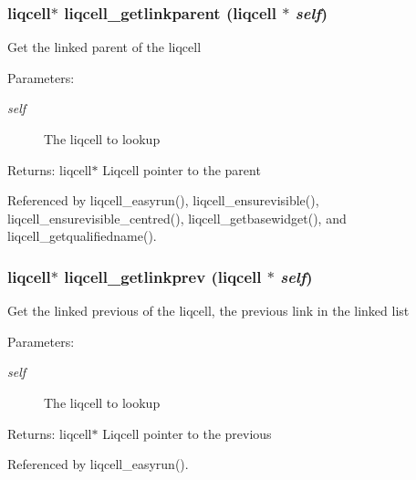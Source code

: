 \subsubsection[{liqcell\_\-getlinkparent}]{\setlength{\rightskip}{0pt plus 5cm}liqcell$\ast$ liqcell\_\-getlinkparent (liqcell $\ast$ {\em self})}\label{d5/da2/liqcell_8c_edd0e88e37a725443f07fa04d7aaf06b}


Get the linked parent of the liqcell \begin{Desc}
\item[Parameters:]
\begin{description}
\item[{\em self}]The liqcell to lookup \end{description}
\end{Desc}
\begin{Desc}
\item[Returns:]liqcell$\ast$ Liqcell pointer to the parent \end{Desc}


Referenced by liqcell\_\-easyrun(), liqcell\_\-ensurevisible(), liqcell\_\-ensurevisible\_\-centred(), liqcell\_\-getbasewidget(), and liqcell\_\-getqualifiedname().
\subsubsection[{liqcell\_\-getlinkprev}]{\setlength{\rightskip}{0pt plus 5cm}liqcell$\ast$ liqcell\_\-getlinkprev (liqcell $\ast$ {\em self})}\label{d5/da2/liqcell_8c_8fbd0b45680e98ce91d83a31185c5ea9}


Get the linked previous of the liqcell, the previous link in the linked list \begin{Desc}
\item[Parameters:]
\begin{description}
\item[{\em self}]The liqcell to lookup \end{description}
\end{Desc}
\begin{Desc}
\item[Returns:]liqcell$\ast$ Liqcell pointer to the previous \end{Desc}


Referenced by liqcell\_\-easyrun().
